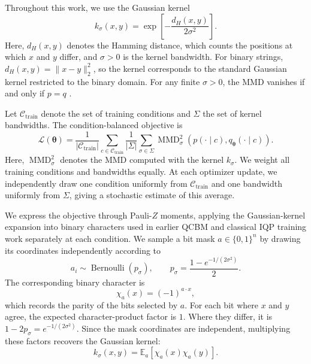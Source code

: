 \documentclass[pra,aps,10pt,twocolumn,floatfix,superscriptaddress, notitlepage,longbibliography]{revtex4-2}
\newcommand{\E}{\mathbb{E}}
\newcommand{\mmd}{\operatorname{MMD}}
\begin{document}
Throughout this work, we use the Gaussian kernel
\begin{equation}
    k_\sigma(x,y)
    =
    \exp\!\left[
        -\frac{d_H(x,y)}{2\sigma^2}
    \right].
    \label{eq:hamming-rbf-kernel}
\end{equation}
Here, $d_H(x,y)$ denotes the Hamming distance, which counts the positions at which $x$ and $y$ differ, and $\sigma>0$ is the kernel bandwidth. For binary strings, $d_H(x,y)=\|x-y\|_2^2$, so the kernel corresponds to the standard Gaussian kernel restricted to the binary domain. For any finite $\sigma>0$, the MMD vanishes if and only if $p=q$ \cite{grettonKernelTwoSample2012}.

Let $\mathcal C_{\mathrm{train}}$ denote the set of training conditions and $\Sigma$ the set of kernel bandwidths. The condition-balanced objective is
\begin{equation}
    \mathcal L(\boldsymbol{\theta})
    =
    \frac{1}{|\mathcal C_{\mathrm{train}}|}
    \sum_{c\in\mathcal C_{\mathrm{train}}}
    \frac{1}{|\Sigma|}
    \sum_{\sigma\in\Sigma}
    \mmd_\sigma^2
    \!\left(
        p(\cdot\mid c),
        q_{\boldsymbol{\theta}}(\cdot\mid c)
    \right).
    \label{eq:conditional-objective}
\end{equation}
Here, $\mmd_\sigma^2$ denotes the MMD computed with the kernel $k_\sigma$. We weight all training conditions and bandwidths equally. At each optimizer update, we independently draw one condition uniformly from $\mathcal C_{\mathrm{train}}$ and one bandwidth uniformly from $\Sigma$, giving a stochastic estimate of this average.

We express the objective through Pauli-$Z$ moments, applying the Gaussian-kernel expansion into binary characters used in earlier QCBM and classical IQP training work \cite{rudolphTrainabilityBarriersOpportunities2024,recio-armengolTrainClassicalDeploy2026} separately at each condition. We sample a bit mask $a\in\{0,1\}^n$ by drawing its coordinates independently according to
\begin{equation}
    a_i\sim\operatorname{Bernoulli}(p_\sigma),
    \qquad
    p_\sigma=
    \frac{1-e^{-1/(2\sigma^2)}}{2}.
    \label{eq:mmd-mask-law}
\end{equation}
The corresponding binary character is
\begin{equation}
    \chi_a(x)=(-1)^{a\cdot x},
\end{equation}
which records the parity of the bits selected by $a$. For each bit where $x$ and $y$ agree, the expected character-product factor is $1$. Where they differ, it is $1-2p_\sigma=e^{-1/(2\sigma^2)}$. Since the mask coordinates are independent, multiplying these factors recovers the Gaussian kernel:
\begin{equation}
    k_\sigma(x,y)
    =
    \E_a\!\left[
        \chi_a(x)\chi_a(y)
    \right].
    \label{eq:hamming-character-expansion}
\end{equation}
\end{document}
